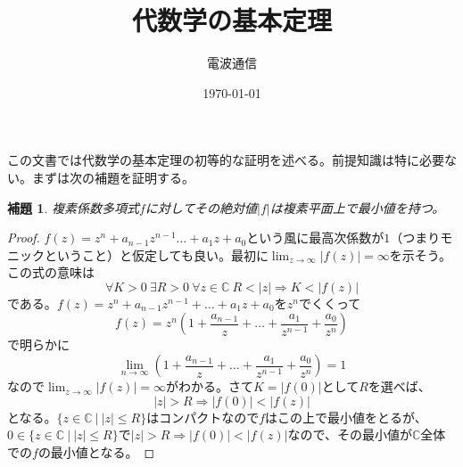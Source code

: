 \documentclass{jsarticle}
\title{代数学の基本定理}
\author{電波通信}
\date{\today}
\newtheorem{lemma}[theorem]{補題}
\newcommand{\cc}{\mathbb{C}}
\begin{document}
\maketitle
この文書では代数学の基本定理の初等的な証明を述べる。前提知識は特に必要ない。まずは次の補題を証明する。

\begin{lemma}複素係数多項式$f$に対してその絶対値$|f|$は複素平面上で最小値を持つ。
\end{lemma}
\begin{proof}$f(z)=z^n+a_{n-1}z^{n-1}\dots+a_1z+a_0$という風に最高次係数が$1$（つまりモニックということ）と仮定しても良い。最初に$\displaystyle \lim_{z\rightarrow \infty}|f(z)|=\infty$を示そう。この式の意味は
\[
\forall K>0\ \exists R>0\ \forall z\in \cc\ R<|z|\Rightarrow K<|f(z)|
\]である。$f(z)=z^n+a_{n-1}z^{n-1}+\dots+a_1z+a_0$を$z^n$でくくって
\[
f(z)=z^n\left(1+\frac{a_{n-1}}{z}+\dots +\frac{a_1}{z^{n-1}}+\frac{a_0}{z^n}\right)
\]で明らかに
\[
\lim_{n\rightarrow \infty}\left(1+\frac{a_{n-1}}{z}+\dots +\frac{a_1}{z^{n-1}}+\frac{a_0}{z^n}\right)=1
\]
なので$\displaystyle \lim_{z\rightarrow \infty}|f(z)|=\infty$がわかる。さて$K=|f(0)|$として$R$を選べば、
\[
|z|>R\Rightarrow |f(0)|<|f(z)|
\]
となる。$\{z\in \cc\ |\ |z|\le R\}$はコンパクトなので$f$はこの上で最小値をとるが、$0\in \{z\in \cc\ |\ |z|\le R\}$で$|z|>R\Rightarrow |f(0)|<|f(z)|$なので、その最小値が$\cc$全体での$f$の最小値となる。
\end{proof}
\end{document}
